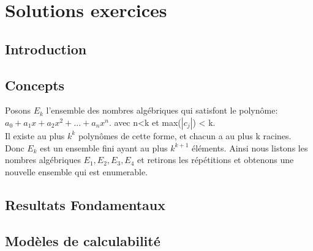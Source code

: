 
\chapter{Solutions exercices}
\label{ch:solExer}

%

\section{Introduction}





\section{Concepts}

 Posons $E_k$ l'ensemble des nombres algébriques qui satisfont le polynôme:\\
   $a_0 + a_1x + a_2x^2 + ... + a_nx^n$. avec n<k et max($|c_j|$) < k.\\
 Il existe au plus $k^k$ polynômes de cette forme,
et chacun a au plus k racines.\\
Donc $E_k$ est un ensemble fini ayant au plus $k^{k+1}$ éléments. Ainsi nous listons les nombres algébriques $E_1, E_2, E_3, E_4$ et retirons les répétitions et obtenons une nouvelle ensemble qui est enumerable.
 
 



\section{Resultats Fondamentaux}




\section{Modèles de calculabilité}




